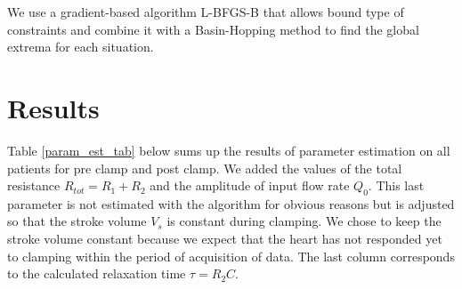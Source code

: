 \documentclass{config}
\begin{document}
We use a gradient-based algorithm L-BFGS-B that allows bound type of constraints and combine it with a Basin-Hopping method to find the global extrema for each situation. \\

\section{Results}

Table \ref{param_est_tab} below sums up the results of parameter estimation on all patients for pre clamp and post clamp. We added the values of the total resistance $R_{tot} = R_1 + R_2$ and the amplitude of input flow rate $Q_0$. This last parameter is not estimated with the algorithm for obvious reasons but is adjusted so that the stroke volume $V_s$ is constant during clamping. We chose to keep the stroke volume constant because we expect that the heart has not responded yet to clamping within the period of acquisition of data. The last column corresponds to the calculated relaxation time $\tau = R_2 C$.\\
\end{document}
